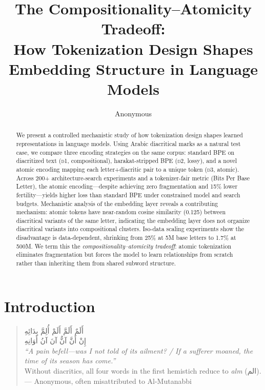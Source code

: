 \documentclass[11pt]{article}
\title{The Compositionality--Atomicity Tradeoff:\\How Tokenization Design Shapes Embedding Structure in Language Models}
\author{Anonymous}
\newcommand{\textarabic}[1]{{\arabicfont\beginR #1\endR}}
\newcommand{\dOne}{\textsc{d1}}
\newcommand{\dTwo}{\textsc{d2}}
\newcommand{\dThree}{\textsc{d3}}
\begin{document}
\maketitle

\begin{abstract}
We present a controlled mechanistic study of how tokenization design shapes learned representations in language models.
Using Arabic diacritical marks as a natural test case, we compare three encoding strategies on the same corpus: standard BPE on diacritized text (\dOne{}, compositional), harakat-stripped BPE (\dTwo{}, lossy), and a novel atomic encoding mapping each letter+diacritic pair to a unique token (\dThree{}, atomic).
Across 200+ architecture-search experiments and a tokenizer-fair metric (Bits Per Base Letter), the atomic encoding---despite achieving zero fragmentation and 15\% lower fertility---yields higher loss than standard BPE under constrained model and search budgets.
Mechanistic analysis of the embedding layer reveals a contributing mechanism: atomic tokens have near-random cosine similarity (0.125) between diacritical variants of the same letter, indicating the embedding layer does not organize diacritical variants into compositional clusters.
Iso-data scaling experiments show the disadvantage is data-dependent, shrinking from 25\% at 5M base letters to 1.7\% at 500M.
We term this the \emph{compositionality--atomicity tradeoff}: atomic tokenization eliminates fragmentation but forces the model to learn relationships from scratch rather than inheriting them from shared subword structure.
\end{abstract}

\section{Introduction}

\begin{quote}
\centering
\textarabic{أَلَمٌ أَلَمَّ أَلَمْ أُلِمَّ بِدَائِهِ}\\
\textarabic{إِنْ أَنَّ آنٌّ آنَ آنُ أَوَانِهِ}\\[4pt]
\small\emph{``A pain befell---was I not told of its ailment? / If a sufferer moaned, the time of its season has come.''}\\[2pt]
\small Without diacritics, all four words in the first hemistich reduce to \emph{alm} ({\arabicfont الم}).\\
\small --- Anonymous, often misattributed to Al-Mutanabbi
\end{quote}
\vspace{-4pt}
\end{document}
